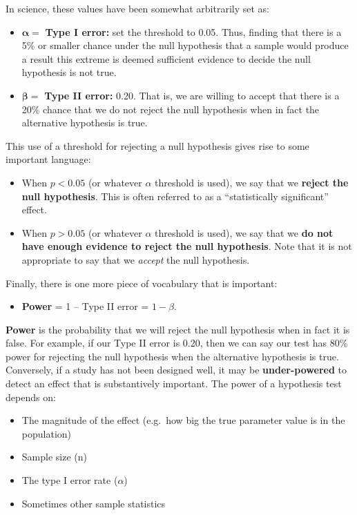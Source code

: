 \documentclass[
  letterpaper,
  DIV=11,
  numbers=noendperiod]{scrreprt}
\providecommand{\tightlist}{%
  \setlength{\itemsep}{0pt}\setlength{\parskip}{0pt}}\usepackage{longtable,booktabs,array}
\theoremstyle{definition}
\theoremstyle{remark}
\begin{document}
In science, these values have been somewhat arbitrarily set as:

\begin{itemize}
\tightlist
\item
  \(\boldsymbol{\alpha} =\) \textbf{Type I error:} set the threshold to
  0.05. Thus, finding that there is a 5\% or smaller chance under the
  null hypothesis that a sample would produce a result this extreme is
  deemed sufficient evidence to decide the null hypothesis is not true.
\item
  \(\boldsymbol{\beta =}\) \textbf{Type II error:} 0.20. That is, we are
  willing to accept that there is a 20\% chance that we do not reject
  the null hypothesis when in fact the alternative hypothesis is true.
\end{itemize}

This use of a threshold for rejecting a null hypothesis gives rise to
some important language:

\begin{itemize}
\tightlist
\item
  When \(p < 0.05\) (or whatever \(\alpha\) threshold is used), we say
  that we \textbf{reject the null hypothesis}. This is often referred to
  as a ``statistically significant'' effect.
\item
  When \(p > 0.05\) (or whatever \(\alpha\) threshold is used), we say
  that we \textbf{do not have enough evidence to reject the null
  hypothesis}. Note that it is not appropriate to say that we
  \emph{accept} the null hypothesis.
\end{itemize}

Finally, there is one more piece of vocabulary that is important:

\begin{itemize}
\tightlist
\item
  \textbf{Power} = 1 -- Type II error = \(1-\beta\).
\end{itemize}

\textbf{Power} is the probability that we will reject the null
hypothesis when in fact it is false. For example, if our Type II error
is 0.20, then we can say our test has 80\% power for rejecting the null
hypothesis when the alternative hypothesis is true. Conversely, if a
study has not been designed well, it may be \textbf{under-powered} to
detect an effect that is substantively important. The power of a
hypothesis test depends on:

\begin{itemize}
\tightlist
\item
  The magnitude of the effect (e.g.~how big the true parameter value is
  in the population)
\item
  Sample size (n)
\item
  The type I error rate (\(\alpha\))
\item
  Sometimes other sample statistics
\end{itemize}
\end{document}
